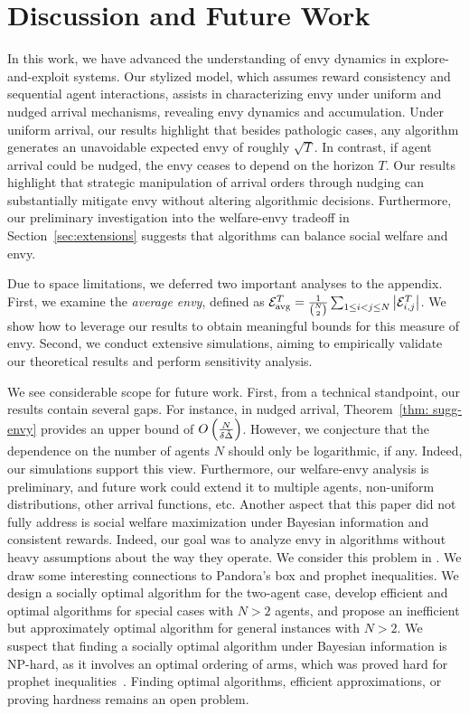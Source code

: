 \section{Discussion and Future Work}
\label{sec:discussion}
In this work, we have advanced the understanding of envy dynamics in explore-and-exploit systems. Our stylized model, which assumes reward consistency and sequential agent interactions, assists in characterizing envy under uniform and nudged arrival mechanisms, revealing envy dynamics and accumulation. Under uniform arrival, our results highlight that besides pathologic cases, any algorithm generates an unavoidable expected envy of roughly $\sqrt T$. In contrast, if agent arrival could be nudged, the envy ceases to depend on the horizon $T$. Our results highlight that strategic manipulation of arrival orders through nudging can substantially mitigate envy without altering algorithmic decisions. Furthermore, our preliminary investigation into the welfare-envy tradeoff in Section~\ref{sec:extensions} suggests that algorithms can balance social welfare and envy. 

Due to space limitations, we deferred two important analyses to the appendix. First, we examine the \emph{average envy}, defined as $\mathcal{E}_{\textnormal{avg}}^T = \frac{1}{\binom{N}{2}}\sum_{1\leq i<j \leq N}{\left\lvert\mathcal{E}_{i,j}^T\right\rvert}$. We show how to leverage our results to obtain meaningful bounds for this measure of envy. Second, we conduct extensive simulations, aiming to empirically validate our theoretical results and perform sensitivity analysis. 


We see considerable scope for future work. First, from a technical standpoint, our results contain several gaps. For instance, in nudged arrival, Theorem~\ref{thm: sugg-envy} provides an upper bound of $O\left(\frac{N}{\delta \tilde\Delta} \right)$. However, we conjecture that the dependence on the number of agents $N$ should only be logarithmic, if any. Indeed, our simulations support this view. Furthermore, our welfare-envy analysis is preliminary, and future work could extend it to multiple agents, non-uniform distributions, other arrival functions, etc. Another aspect that this paper did not fully address is social welfare maximization under Bayesian information and consistent rewards. Indeed, our goal was to analyze envy in algorithms without heavy assumptions about the way they operate. We consider this problem in . We draw some interesting connections to Pandora's box and prophet inequalities. We design a socially optimal algorithm for the two-agent case, develop efficient and optimal algorithms for special cases with $N>2$ agents, and propose an inefficient but approximately optimal algorithm for general instances with $N>2$. We suspect that finding a socially optimal algorithm under Bayesian information is NP-hard, as it involves an optimal ordering of arms, which was proved hard for prophet inequalities~\cite{agrawal2020optimal}. Finding optimal algorithms, efficient approximations, or proving hardness remains an open problem.

